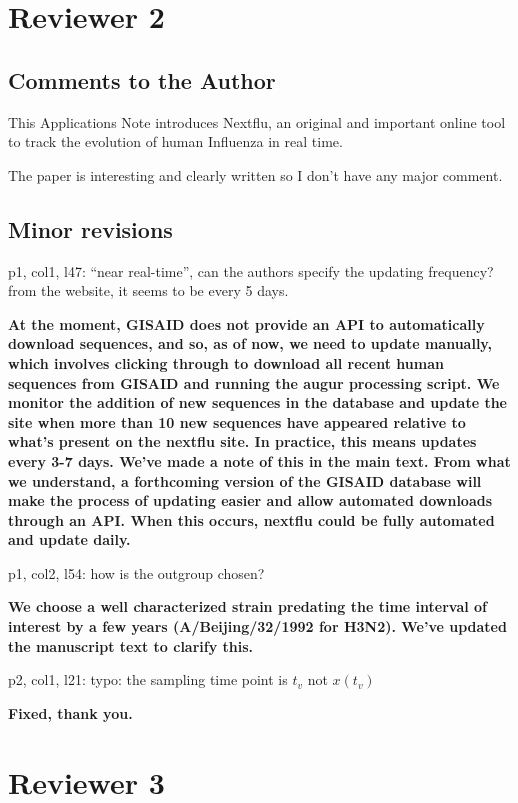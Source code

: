 \documentclass[11pt,oneside,letterpaper]{article}
\begin{document}
\section*{Reviewer 2}

\subsection*{Comments to the Author}

This Applications Note introduces Nextflu, an original and important online tool to track the evolution of human Influenza in real time.

The paper is interesting and clearly written so I don't have any major comment.

\subsection*{Minor revisions}

p1, col1, l47: ``near real-time'', can the authors specify the updating frequency? from the website, it seems to be every 5 days.

{\bf At the moment, GISAID does not provide an API to automatically download sequences, and so, as of now, we need to update manually, which involves clicking through to download all recent human sequences from GISAID and running the augur processing script. We monitor the addition of new sequences in the database and update the site when more than 10 new sequences have appeared relative to what's present on the nextflu site. In practice, this means updates every 3-7 days. We've made a note of this in the main text. From what we understand, a forthcoming version of the GISAID database will make the process of updating easier and allow automated downloads through an API. When this occurs, nextflu could be fully automated and update daily.}

p1, col2, l54: how is the outgroup chosen?

{\bf We choose a well characterized strain predating the time interval of interest by a few years (A/Beijing/32/1992 for H3N2). We've updated the manuscript text to clarify this.}

p2, col1, l21: typo: the sampling time point is $t_v$ not $x(t_v)$

{\bf Fixed, thank you.}

\section*{Reviewer 3}
\end{document}
